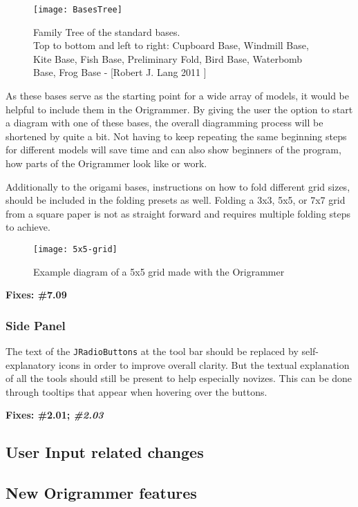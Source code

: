  \begin{figure}[htbp]
	\centering
	\texttt{[image: BasesTree]}
	\caption{Family Tree of the standard bases.\\
	Top to bottom and left to right:  Cupboard Base, Windmill Base, Kite Base, Fish Base, Preliminary Fold, Bird Base, Waterbomb Base, Frog Base - [Robert J. Lang 2011 \cite{BaseTree}]}
	\label{fig:basesTree}
\end{figure}

As these bases serve as the starting point for a wide array of models, it would be helpful to include them in the Origrammer. By giving the user the option to start a diagram with one of these bases, the overall diagramming process will be shortened by quite a bit. Not having to keep repeating the same beginning steps for different models will save time and can also show beginners of the program, how parts of the Origrammer look like or work.

Additionally to the origami bases, instructions on how to fold different grid sizes, should be included in the folding presets as well. Folding a 3x3, 5x5, or 7x7 grid from a square paper is not as straight forward and requires multiple folding steps to achieve. 

 \begin{figure}[htbp]
	\centering
	\texttt{[image: 5x5-grid]}
	\caption{Example diagram of a 5x5 grid made with the Origrammer}
	\label{fig:5x5-grid}
\end{figure}


\textbf{Fixes: \#7.09}

\subsubsection{Side Panel}

The text of the \texttt{JRadioButtons} at the tool bar should be replaced by self-explanatory icons in order to improve overall clarity. But the textual explanation of all the tools should still be present to help especially novizes. This can be done through tooltips that appear when hovering over the buttons.

\textbf{Fixes: \#2.01; \emph{\#2.03}}

\subsection{User Input related changes}

\subsection{New Origrammer features}

